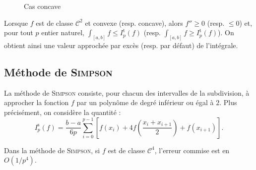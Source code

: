 \begin{marginfigure}[0cm]
\begin{subfigure}{.5\textwidth}
    \caption{Cas concave}
\end{subfigure}
\caption{}
\end{marginfigure}

\begin{remarque}
Lorsque $f$ est de classe $\mathscr{C}^2$ et convexe (resp. concave), alors $f'' \geqslant 0$ (resp. $\leqslant 0$) et, pour tout $p$ entier naturel, \mbox{$\int_{[a,b]} f \leqslant I_p^\mathrm{t}(f)$} (resp. \mbox{$\int_{[a,b]} f \geqslant I_p^\mathrm{t}(f)$}). On obtient ainsi une valeur approchée par excès (resp. par défaut) de l'intégrale.
\end{remarque}

\subsection{Méthode de \textsc{Simpson}}

La méthode de \textsc{Simpson} consiste, pour chacun des intervalles de la subdivision, à approcher la fonction $f$ par un polynôme de degré inférieur ou égal à $2$. Plus précisément, on considère la quantité :
\[
I_p^\mathrm{s}(f) = \frac{b-a}{6 p} \sum_{i=0}^{p-1} \left[f(x_i)+ 4 f\left(\frac{x_i + x_{i+1}}{2}\right) + f(x_{i+1})\right].
\]

\begin{prop}{}{}
Dans la méthode de \textsc{Simpson}, si $f$ est de classe $\mathscr{C}^4$, l'erreur commise est en $O(1/p^4)$.
\end{prop}

